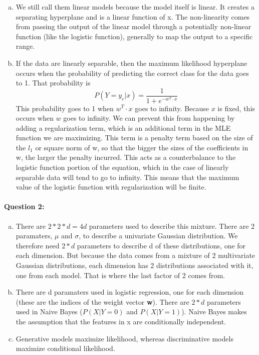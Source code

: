 \documentclass[letterpaper,11pt]{article}
\begin{document}
\begin{enumerate}[(a)]
\item
 We still call them linear models because the model itself is linear. It creates a separating hyperplane
and is a linear function of x. The non-linearity comes from passing the output of the linear model through
a potentially non-linear function (like the logistic function), generally to map the output to a specific range.
\item
If the data are linearly separable, then the maximum likelihood hyperplane occurs when the probability of
predicting the correct class for the data goes to 1. That probability is
\begin{equation}
  P(Y=y_{c} | x) = \frac{1}{1 + e^{-w^T \cdot x}}
\end{equation}
This probability goes to 1 when $w^T \cdot x$ goes to infinity. Because $x$ is fixed, this occurs when
$w$ goes to infinity. We can prevent this from happening by adding a regularization term, which is an additional
term in the MLE function we are maximizing. This term is a penalty term based on the size of the $l_1$ or square norm
of w, so that the bigger the sizes of the coefficients in w, the larger the penalty incurred. This acts as a
counterbalance to the logistic function portion of the equation, which in the case of linearly separable
data will tend to go to infinity. This means that the maximum value of the logistic function with
regularization will be finite.
\end{enumerate}

\paragraph{Question 2:}
\begin{enumerate}[(a)]
\item
There are $2*2*d = 4d$ parameters used to describe this mixture. There are 2 paramaters, $\mu$ and $\sigma$,
to describe a univariate Gaussian distribution. We therefore need $2*d$ parameters to describe d of these
distributions, one for each dimension. But because the data comes from a mixture of 2 multivariate Gaussian
distributions, each dimension has 2 distributions associated with it, one from each model. That is where the last
factor of 2 comes from.
\item
There are d paramaters used in logistic regression, one for each dimension (these are the indices of the weight vector \textbf{w}).
There are $2*d$ parameters used in Naive Bayes ($P(X|Y = 0)$ and $P(X|Y = 1)$). Naive Bayes makes the assumption that the
features in x are conditionally independent.
\item
Generative models maximize likelihood, whereas discriminative models maximize conditional likelihood.
\end{enumerate}
\end{document}
